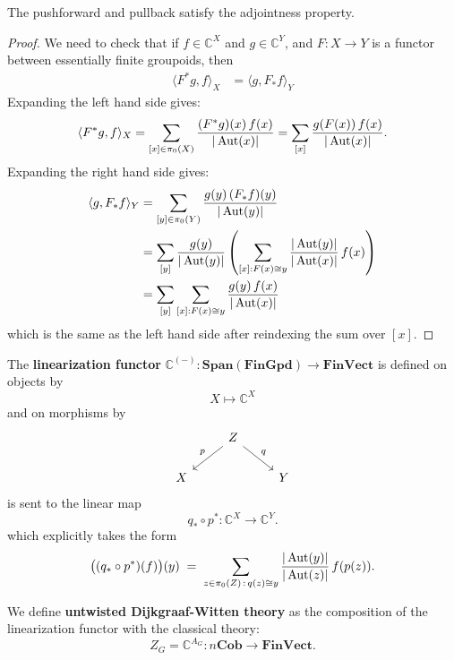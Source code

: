 \documentclass[12pt]{article}
\begin{document}
\begin{proposition}
    The pushforward and pullback satisfy the adjointness property.
\end{proposition}
\begin{proof}
    We need to check that if $f\in \mathbb{C}^X$ and $g\in \mathbb{C}^Y$, and $F : X \to Y$ is a functor between essentially finite groupoids, then
     \begin{align*}
        \langle F^* g, f\rangle_X & = \langle g, F_* f\rangle_Y
    \end{align*}
Expanding the left hand side gives:
\[
\langle F^* g, f\rangle_X
= \sum_{[x]\in \pi_0(X)} \frac{(F^* g)(x)\, f(x)}{|\operatorname{Aut}(x)|}
= \sum_{[x]} \frac{g(F(x))\, f(x)}{|\operatorname{Aut}(x)|}.
\]
Expanding the right hand side gives:
\begin{align*}
    \langle g, F_* f\rangle_Y &= \sum_{[y]\in \pi_0(Y)} \frac{g(y)\, (F_* f)(y)}{|\operatorname{Aut}(y)|} \\
    &= \sum_{[y]} \frac{g(y)}{|\operatorname{Aut}(y)|} \left( \sum_{[x]:F(x)\cong y} \frac{|\operatorname{Aut}(y)|}{|\operatorname{Aut}(x)|}\, f(x) \right) \\
    &= \sum_{[y]} \sum_{[x]:F(x)\cong y} \frac{g(y)\, f(x)}{|\operatorname{Aut}(x)|}
\end{align*}
which is the same as the left hand side after reindexing the sum over $[x]$. 
\end{proof}

\begin{definition} The \textbf{linearization functor} $\mathbb{C}^{(-)} : \mathbf{Span}(\mathbf{FinGpd}) \to \mathbf{FinVect}$ is defined on objects by
    \[
        X \mapsto \mathbb{C}^X
    \]
and on morphisms by
\[
\begin{tikzcd}
& Z \arrow[dl, "p"'] \arrow[dr, "q"] & \\
X & & Y
\end{tikzcd}
\]
    is sent to the linear map
    \[
    q_* \circ p^* : \mathbb{C}^X \to \mathbb{C}^Y.
    \]
    which explicitly takes the form
\[
\big((q_* \circ p^*)(f)\big)(y) \;=\; 
\sum_{z \in \pi_0(Z)\,:\,q(z)\cong y} \frac{|\operatorname{Aut}(y)|}{|\operatorname{Aut}(z)|}\, f(p(z)).
\]
\end{definition}

\begin{definition}
We define \textbf{untwisted Dijkgraaf-Witten theory} as the composition of the linearization functor with the classical theory:
\[
Z_G = \mathbb{C}^{A_G} : n\mathbf{Cob} \to \mathbf{FinVect}.
\]
\end{definition}
\end{document}
